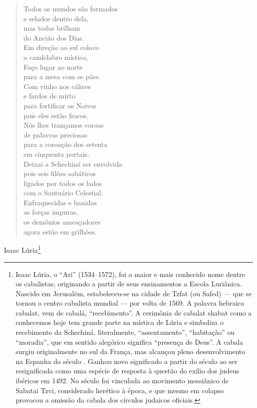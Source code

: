 \begin{verse}
Todos os mundos são formados\\
e selados dentro dela,\\
mas todos brilham\\
do Ancião dos Dias.\\[5pt]

Em direção ao sul coloco\\
o candelabro místico,\\
Faço lugar ao norte\\
para a mesa com os pães.\\[5pt]

Com vinho nos cálices\\
e fardos de mirto\\
para fortificar os Noivos\\
pois eles estão fracos.\\[5pt]

Nós lhes trançamos coroas\\
de palavras preciosas\\
para a coroação dos setenta\\
em cinquenta portais.\\[5pt]

Deixai a Schechiná ser envolvida\\
pois seis filões sabáticos\\
ligados por todos os lados\\
com o Santuário Celestial.\\[5pt]

Enfraquecidas e banidas\\
as forças impuras,\\
os demônios ameaçadores\\
agora estão em grilhões.
\end{verse}

\begin{flushright}
Isaac Lúria\footnote{Isaac Lúria, o ``Ari'' (1534--1572), foi o maior e mais conhecido nome dentre os cabalistas, originando a partir de seus ensinamentos a Escola Luriânica. Nascido em Jerusalém, estabeleceu-se na cidade de Tzfat (ou Safed) --- que se tornou o centro cabalista mundial --- por volta de 1569. A palavra hebraica cabalat, vem de cabalá, ``recebimento''. A cerimônia de cabalat shabat como a conhecemos hoje tem grande parte na mística de Lúria e simboliza o recebimento da Schechiná, literalmente, ``assentamento'', ``habitação'' ou ``moradia'', que em sentido alegórico significa ``presença de Deus''. A cabala surgiu originalmente no sul da França, mas alcançou pleno desenvolvimento na Espanha do século . Ganhou novo significado a partir do século  ao ser resignificada como uma espécie de resposta à questão do exílio dos judeus ibéricos em 1492. No século  foi vinculada ao movimento messiânico de Sabatai Tzvi, considerado herético à época, e que mesmo em colapso provocou a omissão da cabala dos círculos judaicos oficiais.}
\end{flushright}

